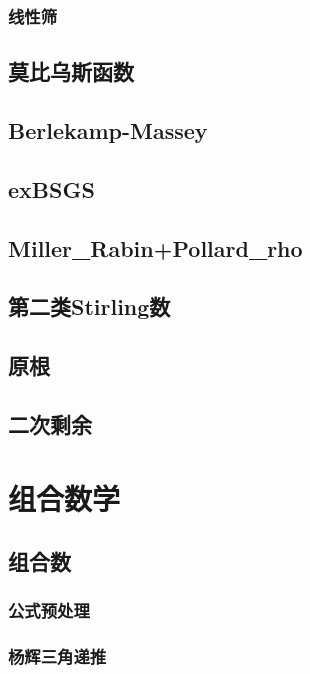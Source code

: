 \documentclass[a4paper,twocolumn]{article}
\begin{document}
\subsubsection{线性筛}

\subsection{莫比乌斯函数}

\subsection{Berlekamp-Massey}

\subsection{exBSGS}

\subsection{Miller\_Rabin+Pollard\_rho}

\subsection{第二类Stirling数}

\subsection{原根}
\begin{spacing}{1.5}

\end{spacing}

\subsection{二次剩余}

\section{组合数学}
\subsection{组合数}
\subsubsection{公式预处理}

\subsubsection{杨辉三角递推}

\end{document}
